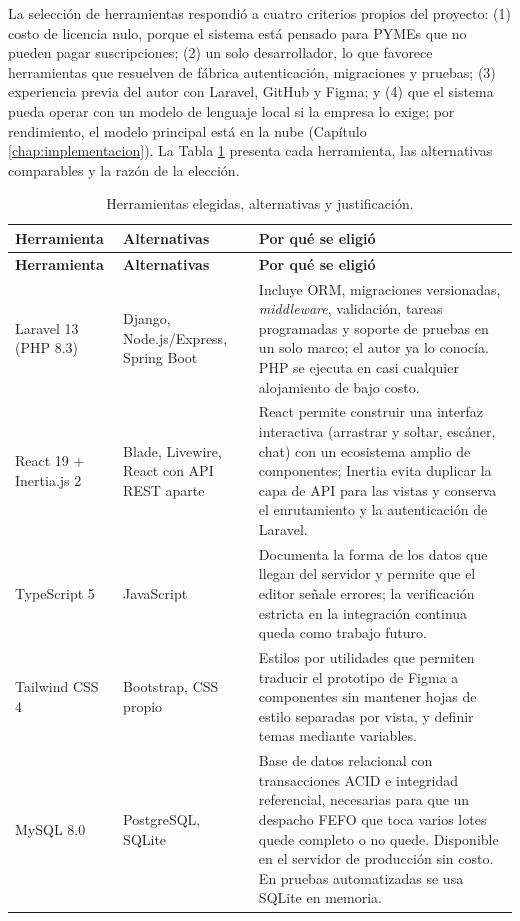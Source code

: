 La selección de herramientas respondió a cuatro criterios propios del proyecto: (1) costo de licencia nulo, porque el sistema está pensado para PYMEs que no pueden pagar suscripciones; (2) un solo desarrollador, lo que favorece herramientas que resuelven de fábrica autenticación, migraciones y pruebas; (3) experiencia previa del autor con Laravel, GitHub y Figma; y (4) que el sistema pueda operar con un modelo de lenguaje local si la empresa lo exige; por rendimiento, el modelo principal está en la nube (Capítulo \ref{chap:implementacion}). La Tabla \ref{tab:dis_herramientas} presenta cada herramienta, las alternativas comparables y la razón de la elección.

{\small
\begin{longtable}{|p{2.4cm}|p{2.9cm}|p{8.3cm}|}
\caption{Herramientas elegidas, alternativas y justificación.}
\label{tab:dis_herramientas}\\
\hline
\textbf{Herramienta} & \textbf{Alternativas} & \textbf{Por qué se eligió} \\
\hline
\endfirsthead
\hline
\textbf{Herramienta} & \textbf{Alternativas} & \textbf{Por qué se eligió} \\
\hline
\endhead
Laravel 13 (PHP 8.3) & Django, Node.js/Express, Spring Boot & Incluye ORM, migraciones versionadas, \textit{middleware}, validación, tareas programadas y soporte de pruebas en un solo marco; el autor ya lo conocía. PHP se ejecuta en casi cualquier alojamiento de bajo costo. \\ \hline
React 19 + Inertia.js 2 & Blade, Livewire, React con API REST aparte & React permite construir una interfaz interactiva (arrastrar y soltar, escáner, chat) con un ecosistema amplio de componentes; Inertia evita duplicar la capa de API para las vistas y conserva el enrutamiento y la autenticación de Laravel. \\ \hline
TypeScript 5 & JavaScript & Documenta la forma de los datos que llegan del servidor y permite que el editor señale errores; la verificación estricta en la integración continua queda como trabajo futuro. \\ \hline
Tailwind CSS 4 & Bootstrap, CSS propio & Estilos por utilidades que permiten traducir el prototipo de Figma a componentes sin mantener hojas de estilo separadas por vista, y definir temas mediante variables. \\ \hline
MySQL 8.0 & PostgreSQL, SQLite & Base de datos relacional con transacciones ACID e integridad referencial, necesarias para que un despacho FEFO que toca varios lotes quede completo o no quede. Disponible en el servidor de producción sin costo. En pruebas automatizadas se usa SQLite en memoria. \\ \hline

\end{longtable}}
